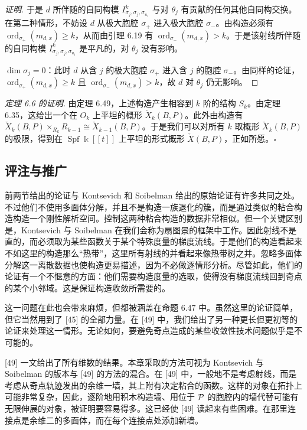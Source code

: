 \begin{proof}[证明]
于是 $d$ 所伴随的自同构模 $I_{\sigma_j,\sigma_j,\sigma_{u_1}}^k$ 与对 $\theta_j$ 有贡献的任何其他自同构交换。在第二种情形，不妨设 $d$ 从极大胞腔 $\sigma_+$ 进入极大胞腔 $\sigma_-$。由构造必须有 $\operatorname{ord}_{\sigma_+}(m_{d,x})\ge k$，从而由引理 6.19 有 $\operatorname{ord}_{\sigma_-}(m_{d,x})>k$。于是该射线所伴随的自同构模 $I_{\sigma_j,\sigma_j,\sigma_{u_1}}^k$ 是平凡的，对 $\theta_j$ 没有影响。

$\dim\sigma_j=0$：此时 $d$ 从含 $j$ 的极大胞腔 $\sigma_+$ 进入含 $j$ 的胞腔 $\sigma_-$。由同样的论证，$\operatorname{ord}_{\sigma_+}(m_{d,x})\ge k$ 且 $\operatorname{ord}_{\sigma_-}(m_{d,x})>k$，故 $d$ 对 $\theta_j$ 仍无影响。
\end{proof}

\emph{定理 6.6 的证明.} 由定理 6.49，上述构造产生相容到 $k$ 阶的结构 $S_k$。由定理 6.35，这给出一个在 $O_k$ 上平坦的概形 $\check X_k(B,P)$。此外由构造有 $\check X_k(B,P)\times_{R_k}R_{k-1}\cong\check X_{k-1}(B,P)$。于是我们可以对所有 $k$ 取概形 $\check X_k(B,P)$ 的极限，得到在 $\operatorname{Spf} \Bbbk[\![t]\!]$ 上平坦的形式概形 $\check X(B,P)$，正如所愿。\hfill$\square$

\subsection{评注与推广}

前两节给出的论证与 Kontsevich 和 Soibelman 给出的原始论证有许多共同之处。不过他们不使用多面体分解，并且不是构造一族退化的簇，而是通过类似的粘合构造构造一个刚性解析空间。控制这两种粘合构造的数据非常相似。但一个关键区别是，Kontsevich 与 Soibelman 在我们会称为扇图景的框架中工作。因此射线不是直的，而必须取为某些函数关于某个特殊度量的梯度流线。于是他们的构造看起来不如这里的构造那么“热带”，这里所有射线的并看起来像热带树之并。忽略多面体分解这一离散数据也使构造更易描述，因为不必做逐情形分析。尽管如此，他们的论证有一个不惬意的方面：他们需要构造度量的选取，使得没有梯度流线回到奇点的某个小邻域。这是保证构造收敛所需要的。

这一问题在此也会带来麻烦，但都被涵盖在命题 6.47 中。虽然这里的论证简单，但它当然用到了 [45] 的全部力量。在 [49] 中，我们给出了另一种更长但更初等的论证来处理这一情形。无论如何，要避免奇点造成的某些收敛性技术问题似乎是不可能的。

[49] 一文给出了所有维数的结果。本章采取的方法可视为 Kontsevich 与 Soibelman 的版本与 [49] 的方法的混合。在 [49] 中，一般地不是考虑射线，而是考虑从奇点轨迹发出的余维一墙，其上附有决定粘合的函数。这样的对象在拓扑上可能非常复杂，因此，逐阶地用积木构造墙、用位于 $\mathcal{P}$ 的胞腔内的墙代替可能有无限伸展的对象，被证明要容易得多。这已经使 [49] 读起来有些困难。在那里连接点是余维二的多面体，而在每个连接点处添加新墙。

